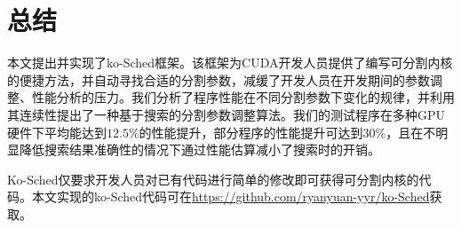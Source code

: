 \chapter{总结}\label{chap:conclusion}

本文提出并实现了ko-Sched框架。该框架为CUDA开发人员提供了编写可分割内核的便捷方法，并自动寻找合适的分割参数，减缓了开发人员在开发期间的参数调整、性能分析的压力。我们分析了程序性能在不同分割参数下变化的规律，并利用其连续性提出了一种基于搜索的分割参数调整算法。我们的测试程序在多种GPU硬件下平均能达到$12.5\%$的性能提升，部分程序的性能提升可达到$30\%$，且在不明显降低搜索结果准确性的情况下通过性能估算减小了搜索时的开销。

Ko-Sched仅要求开发人员对已有代码进行简单的修改即可获得可分割内核的代码。本文实现的ko-Sched代码可在\url{https://github.com/ryanyuan-yyr/ko-Sched}获取。
